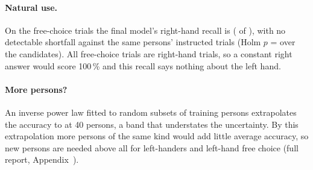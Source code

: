 \paragraph{Natural use.} On the free-choice trials the final model's right-hand recall is 
( of ), with no detectable shortfall against the same persons'
instructed trials (Holm $p$ =  over the  candidates). All free-choice
trials are right-hand trials, so a constant right answer would score 100\,\% and this recall says nothing about the
left hand.

\paragraph{More persons?} An inverse power law fitted to random subsets of training persons extrapolates the
accuracy to  at 40 persons, a band that understates the uncertainty. By this
extrapolation more persons of the same kind would add little average accuracy, so new persons are needed above all
for left-handers and left-hand free choice (full report, Appendix~).
